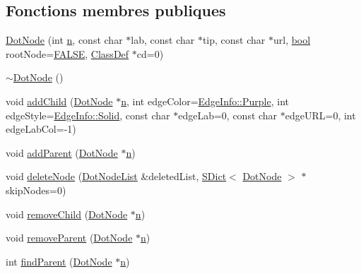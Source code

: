 \subsection*{Fonctions membres publiques}
\begin{DoxyCompactItemize}
\item 
\hyperlink{class_dot_node_aa7e58f70787b510d19e060ef6197d262}{Dot\+Node} (int \hyperlink{060__command__switch_8tcl_acdde3cd86eb2421ce8dbb2e85227d368}{n}, const char $\ast$lab, const char $\ast$tip, const char $\ast$url, \hyperlink{qglobal_8h_a1062901a7428fdd9c7f180f5e01ea056}{bool} root\+Node=\hyperlink{qglobal_8h_a10e004b6916e78ff4ea8379be80b80cc}{F\+A\+L\+S\+E}, \hyperlink{class_class_def}{Class\+Def} $\ast$cd=0)
\item 
\hyperlink{class_dot_node_a8255849e01faa55e877c8f0235a8de3e}{$\sim$\+Dot\+Node} ()
\item 
void \hyperlink{class_dot_node_a6ecb5ecd5496056f827fc28c2889f922}{add\+Child} (\hyperlink{class_dot_node}{Dot\+Node} $\ast$\hyperlink{060__command__switch_8tcl_acdde3cd86eb2421ce8dbb2e85227d368}{n}, int edge\+Color=\hyperlink{struct_edge_info_afd9f10f4693123d11e52bb1127f23228a4f78453f5006dccb5ecea6bd6ae41a98}{Edge\+Info\+::\+Purple}, int edge\+Style=\hyperlink{struct_edge_info_a4fe2d2921d0f51d84da1bf48b3b4f2c5a26f6a09cd44415e9be80ccabf5195989}{Edge\+Info\+::\+Solid}, const char $\ast$edge\+Lab=0, const char $\ast$edge\+U\+R\+L=0, int edge\+Lab\+Col=-\/1)
\item 
void \hyperlink{class_dot_node_a98f7fc0d1caa3e53622039e86903b04e}{add\+Parent} (\hyperlink{class_dot_node}{Dot\+Node} $\ast$\hyperlink{060__command__switch_8tcl_acdde3cd86eb2421ce8dbb2e85227d368}{n})
\item 
void \hyperlink{class_dot_node_af941a78a95b973318ccd12882760a3d4}{delete\+Node} (\hyperlink{class_dot_node_list}{Dot\+Node\+List} \&deleted\+List, \hyperlink{class_s_dict}{S\+Dict}$<$ \hyperlink{class_dot_node}{Dot\+Node} $>$ $\ast$skip\+Nodes=0)
\item 
void \hyperlink{class_dot_node_a62686e145c94129d85409214fb3e0571}{remove\+Child} (\hyperlink{class_dot_node}{Dot\+Node} $\ast$\hyperlink{060__command__switch_8tcl_acdde3cd86eb2421ce8dbb2e85227d368}{n})
\item 
void \hyperlink{class_dot_node_a2a36f34067293e7428ae7ea527678fee}{remove\+Parent} (\hyperlink{class_dot_node}{Dot\+Node} $\ast$\hyperlink{060__command__switch_8tcl_acdde3cd86eb2421ce8dbb2e85227d368}{n})
\item 
int \hyperlink{class_dot_node_a05f42851921caf9442ed2c4e4468b695}{find\+Parent} (\hyperlink{class_dot_node}{Dot\+Node} $\ast$\hyperlink{060__command__switch_8tcl_acdde3cd86eb2421ce8dbb2e85227d368}{n})

\end{DoxyCompactItemize}
